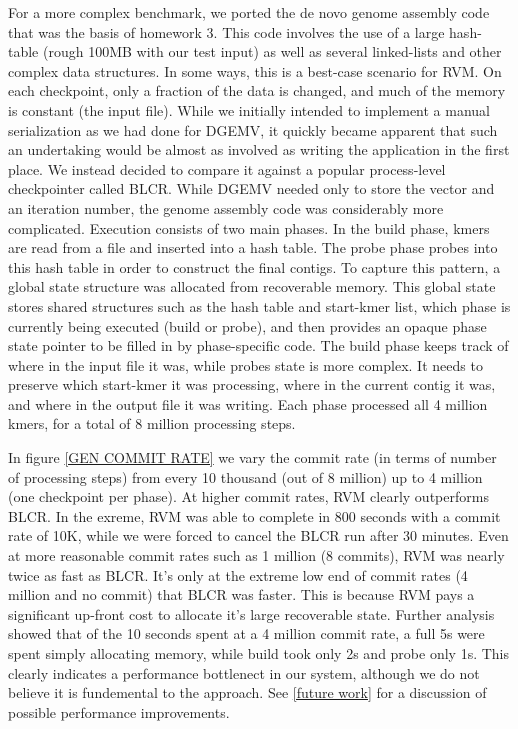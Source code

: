 For a more complex benchmark, we ported the de novo genome assembly code that
was the basis of homework 3. This code involves the use of a large hash-table
(rough 100MB with our test input) as well as several linked-lists and other
complex data structures. In some ways, this is a best-case scenario for RVM. On
each checkpoint, only a fraction of the data is changed, and much of the memory
is constant (the input file). While we initially intended to implement a manual
serialization as we had done for DGEMV, it quickly became apparent that such an
undertaking would be almost as involved as writing the application in the first
place. We instead decided to compare it against a popular process-level
checkpointer called BLCR\cite{BLCR}. While DGEMV needed only to store the vector
and an iteration number, the genome assembly code was considerably more
complicated. Execution consists of two main phases. In the build phase, kmers
are read from a file and inserted into a hash table. The probe phase probes into
this hash table in order to construct the final contigs. To capture this
pattern, a global state structure was allocated from recoverable memory. This
global state stores shared structures such as the hash table and start-kmer
list, which phase is currently being executed (build or probe), and then
provides an opaque phase state pointer to be filled in by phase-specific code.
 The build phase keeps track of where in the input file it was, while probes
state is more complex. It needs to preserve which start-kmer it was
processing, where in the current contig it was, and where in the output file it
was writing. Each phase processed all 4 million kmers, for a total of 8 million
processing steps.

In figure \ref{GEN COMMIT RATE} we vary the commit rate (in terms of number of
processing steps) from every 10 thousand (out of 8 million) up to 4 million
(one checkpoint per phase). At higher commit rates, RVM clearly outperforms
BLCR. In the exreme, RVM was able to complete in 800 seconds with a commit rate
of 10K, while we were forced to cancel the BLCR run after 30 minutes. Even at
more reasonable commit rates such as 1 million (8 commits), RVM was nearly twice
as fast as BLCR. It's only at the extreme low end of commit rates (4 million
and no commit) that BLCR was faster. This is because RVM pays a significant
up-front cost to allocate it's large recoverable state. Further analysis showed
that of the 10 seconds spent at a 4 million commit rate, a full 5s were spent
simply allocating memory, while build took only 2s and probe only 1s. This
clearly indicates a performance bottlenect in our system, although we do not
believe it is fundemental to the approach. See \ref{future work} for a
discussion of possible performance improvements. 

